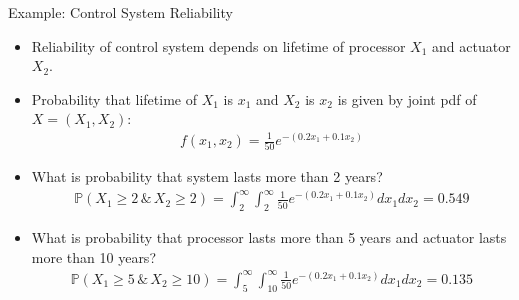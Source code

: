 \documentclass[handout,9pt]{beamer}
\begin{document}
%
\begin{frame}{Example: Control System Reliability}

\begin{itemize}
\setlength{\itemsep}{10pt}
\item Reliability of control system depends on lifetime of processor $X_1$ and actuator $X_2$.
\item Probability that lifetime of $X_1$  is $x_1$ and $X_2$ is $x_2$ is given by joint pdf of $X=(X_1,X_2)$:
\begin{align*}
f(x_1,x_2)=\frac{1}{50}e^{-(0.2x_1+0.1x_2)}
\end{align*} 
\item What is probability that system lasts more than 2 years?
\begin{align*}
\mathbb{P}(X_1\geq 2\,\&\,X_2\geq 2)=\int_{2}^{\infty}\int_{2}^{\infty}\frac{1}{50}e^{-(0.2x_1+0.1x_2)}dx_1dx_2=0.549
\end{align*}
\item What is probability that processor lasts more than 5 years and actuator lasts more than 10 years?
\begin{align*}
\mathbb{P}(X_1\geq 5\,\&\,X_2\geq 10)=\int_{5}^{\infty}\int_{10}^{\infty}\frac{1}{50}e^{-(0.2x_1+0.1x_2)}dx_1dx_2=0.135
\end{align*}
\end{itemize}

\end{frame}
\end{document}

